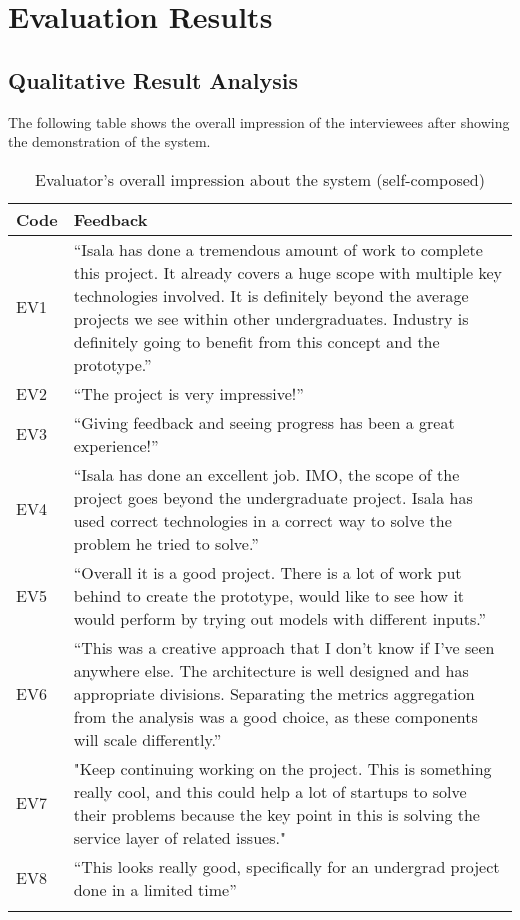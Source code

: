 \newpage
\section{Evaluation Results}

\subsection{Qualitative Result Analysis}

The following table shows the overall impression of the interviewees after showing the demonstration of the system.


\begin{longtable}{|p{8mm}|p{147mm}|}
    \hline
    \textbf{Code} & \textbf{Feedback} \\ \hline

    EV1 & “Isala has done a tremendous amount of work to complete this project. It already covers a huge scope with multiple key technologies involved. It is definitely beyond the average projects we see within other undergraduates. Industry is definitely going to benefit from this concept and the prototype.” \\ \hline

    EV2 & “The project is very impressive!” \\ \hline

    EV3 & “Giving feedback and seeing progress has been a great experience!” \\ \hline

    EV4 & “Isala has done an excellent job. IMO, the scope of the project goes beyond the undergraduate project. Isala has used correct technologies in a correct way to solve the problem he tried to solve.” \\ \hline

    EV5 & “Overall it is a good project. There is a lot of work put behind to create the prototype, would like to see how it would perform by trying out models with different inputs.” \\ \hline

    EV6 & “This was a creative approach that I don't know if I've seen anywhere else. The architecture is well designed and has appropriate divisions. Separating the metrics aggregation from the analysis was a good choice, as these components will scale differently.” \\ \hline

    EV7 & "Keep continuing working on the project. This is something really cool, and this could help a lot of startups to solve their problems because the key point in this is solving the service layer of related issues." \\ \hline

    EV8 & “This looks really good, specifically for an undergrad project done in a limited time” \\ \hline

    \caption{Evaluator's overall impression about the system (self-composed)}
\end{longtable}

